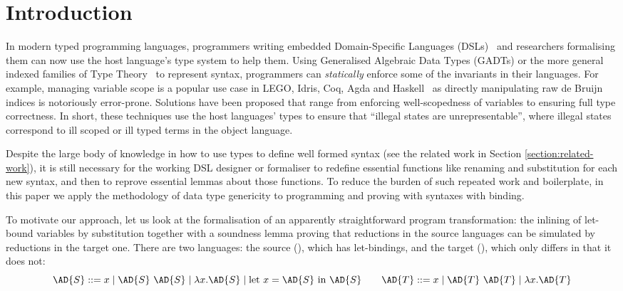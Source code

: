 
\newcommand{\semrec}{\AR{Semantics}}
\newcommand{\semfun}{\AF{semantics}}

\section{Introduction}

In modern typed programming languages, programmers writing embedded
Domain-Specific Languages (DSLs)~\cite{hudak1996building} and researchers formalising them can now
use the host language's type system to help them. Using Generalised
Algebraic Data Types (GADTs) or the more general indexed families of
Type Theory~\cite{dybjer1994inductive} to represent syntax,
programmers can \emph{statically} enforce some of the invariants in
their languages. For example, managing variable scope is a popular use
case in LEGO, Idris, Coq, Agda and
Haskell~\cite{altenkirch1999monadic,DBLP:conf/gpce/BradyH06,DBLP:journals/jar/HirschowitzM12,DBLP:conf/icfp/KeuchelJ12,BachPoulsen,plfa2018,Eisenberg20}
as directly manipulating raw de Bruijn indices is notoriously
error-prone. Solutions have been proposed that range from enforcing
well-scopedness of variables to ensuring full type correctness. In
short, these techniques use the host languages' types to ensure that
``illegal states are unrepresentable'', where illegal states
correspond to ill scoped or ill typed terms in the object language.

Despite the large body of knowledge in how to use types to define well
formed syntax (see the related work in Section
\ref{section:related-work}), it is still necessary for the working DSL
designer or formaliser to redefine essential functions like renaming
and substitution for each new syntax, and then to reprove essential
lemmas about those functions. To reduce the burden of such repeated
work and boilerplate, in this paper we apply the methodology of
data type genericity to programming and proving with syntaxes with
binding.

To motivate our approach, let us look at the formalisation of an
apparently straightforward program transformation: the inlining of
let-bound variables by substitution together with a soundness lemma
proving that reductions in the source languages can be simulated by
reductions in the target one. There are two languages: the source
(), which has let-bindings, and the target (), which only
differs in that it does not:
\begin{displaymath}
  \AD{S} ::= x \mid \AD{S}~\AD{S} \mid \lambda x. \AD{S} \mid \textrm{let }x=\AD{S}\textrm{ in }\AD{S}
  \qquad
  \AD{T} ::= x \mid \AD{T}~\AD{T} \mid \lambda x. \AD{T}
\end{displaymath}

